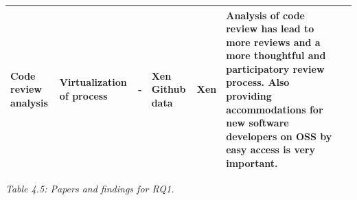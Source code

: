 \documentclass[]{book}
\begin{document}
\begin{longtable}[]{@{}lllllll@{}}
\begin{minipage}[t]{0.16\columnwidth}
Code review analysis\strut
\end{minipage} & \begin{minipage}[t]{0.17\columnwidth}\raggedright\strut
Virtualization of process\strut
\end{minipage} & \begin{minipage}[t]{0.07\columnwidth}\raggedright\strut
-\strut
\end{minipage} & \begin{minipage}[t]{0.10\columnwidth}\raggedright\strut
Xen Github data\strut
\end{minipage} & \begin{minipage}[t]{0.12\columnwidth}\raggedright\strut
Xen\strut
\end{minipage} & \begin{minipage}[t]{0.10\columnwidth}\raggedright\strut
Analysis of code review has lead to more reviews and a more thoughtful
and participatory review process. Also providing accommodations for new
software developers on OSS by easy access is very important.\strut
\end{minipage}\tabularnewline
\bottomrule
\end{longtable}

\emph{Table 4.5: Papers and findings for RQ1.}
\end{document}
